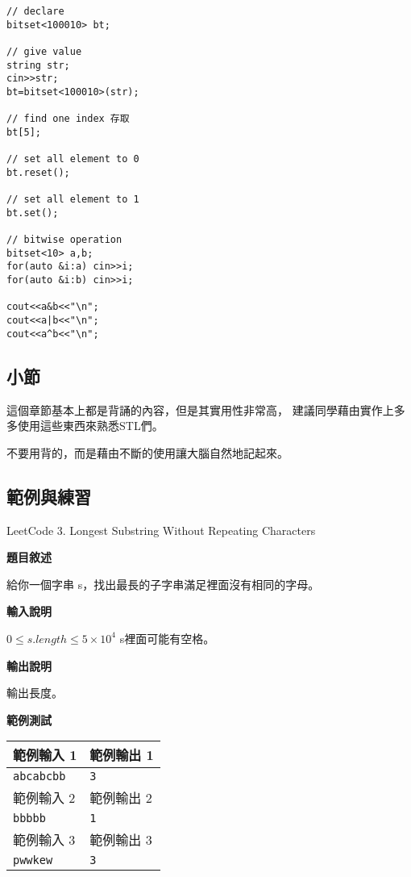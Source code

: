 \begin{lstlisting}[caption=bitset 用法]
// declare
bitset<100010> bt;

// give value
string str;
cin>>str;
bt=bitset<100010>(str);

// find one index 存取
bt[5];

// set all element to 0
bt.reset();

// set all element to 1
bt.set();

// bitwise operation
bitset<10> a,b;
for(auto &i:a) cin>>i;
for(auto &i:b) cin>>i;

cout<<a&b<<"\n";
cout<<a|b<<"\n";
cout<<a^b<<"\n";
\end{lstlisting}

    \subsection{小節}
    這個章節基本上都是背誦的內容，但是其實用性非常高，
    建議同學藉由實作上多多使用這些東西來熟悉STL們。

    \begin{tip}
        不要用背的，而是藉由不斷的使用讓大腦自然地記起來。
    \end{tip}

    \subsection{範例與練習}

    \problem LeetCode 3. Longest Substring Without Repeating Characters

    \textbf{題目敘述}

    給你一個字串 s，找出最長的子字串滿足裡面沒有相同的字母。

    \textbf{輸入說明}

    $0 \le s.length \le 5 \times 10^4$
    s裡面可能有空格。
    
    \textbf{輸出說明}

    輸出長度。

    \textbf{範例測試}

    \begin{tabular}{|m{7cm}|m{7cm}|}
        \hline
        範例輸入 1 & 範例輸出 1 \\
        \hline
        \verb|abcabcbb| & \verb|3| \\
        \hline
        範例輸入 2 & 範例輸出 2 \\
        \hline
        \verb|bbbbb| & \verb|1| \\
        \hline
        範例輸入 3 & 範例輸出 3 \\
        \hline
        \verb|pwwkew| & \verb|3|\\
        \hline
    \end{tabular}